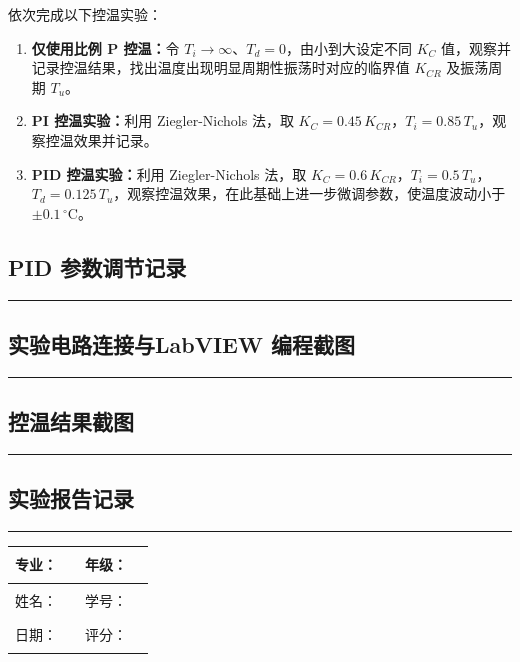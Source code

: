 \documentclass[dvipsnames, svgnames,a4paper,11pt]{article}
\newcommand{\recordblank}[1]{%
  \par\noindent\rule{0.95\linewidth}{0pt}\rule{0pt}{#1}\par}
\begin{document}
依次完成以下控温实验：

\begin{enumerate}
	\item \textbf{仅使用比例 P 控温：}令 $T_i\to\infty$、$T_d=0$，由小到大设定不同 $K_C$ 值，观察并记录控温结果，找出温度出现明显周期性振荡时对应的临界值 $K_{CR}$ 及振荡周期 $T_u$。

	\item \textbf{PI 控温实验：}利用 Ziegler-Nichols 法，取 $K_C=0.45\,K_{CR}$，$T_i=0.85\,T_u$，观察控温效果并记录。

	\item \textbf{PID 控温实验：}利用 Ziegler-Nichols 法，取 $K_C=0.6\,K_{CR}$，$T_i=0.5\,T_u$，$T_d=0.125\,T_u$，观察控温效果，在此基础上进一步微调参数，使温度波动小于 $\pm0.1\,^\circ\mathrm{C}$。
	

\end{enumerate}

\subsection{PID 参数调节记录}
\recordblank{5.5cm}
\subsection{实验电路连接与LabVIEW 编程截图}

\recordblank{6cm}

\clearpage

\subsection{控温结果截图}
\recordblank{6cm}


\subsection{实验报告记录}
\recordblank{5.5cm}
\clearpage

\begin{table}
	\renewcommand\arraystretch{1.7}
	\begin{tabularx}{\textwidth}{|X|X|X|X|}
	\hline
	专业：& \rule{2.5cm}{0.4pt} & 年级：& \rule{2.5cm}{0.4pt}\\
	\hline
	姓名：& \rule{2.5cm}{0.4pt} & 学号：& \rule{3cm}{0.4pt}\\
	\hline
	日期：& \rule{3cm}{0.4pt} & 评分：& \rule{3cm}{0.4pt}\\
	\hline
	\end{tabularx}
\end{table}
\end{document}
